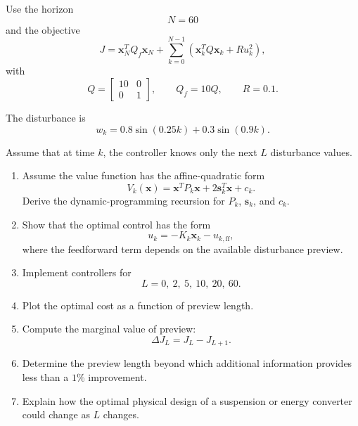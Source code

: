 Use the horizon
\begin{equation}
N=60
\end{equation}
and the objective
\begin{equation}
J=
\mathbf{x}_N^TQ_f\mathbf{x}_N
+
\sum_{k=0}^{N-1}
\left(
\mathbf{x}_k^TQ\mathbf{x}_k
+
Ru_k^2
\right),
\end{equation}
with
\begin{equation}
Q=
\begin{bmatrix}
10&0\\
0&1
\end{bmatrix},
\qquad
Q_f=10Q,
\qquad
R=0.1.
\end{equation}

The disturbance is
\begin{equation}
w_k=
0.8\sin(0.25k)
+
0.3\sin(0.9k).
\end{equation}

Assume that at time $k$, the controller knows only the next $L$
disturbance values.

\begin{enumerate}
    \item Assume the value function has the affine-quadratic form
    \begin{equation}
    V_k(\mathbf{x})
    =
    \mathbf{x}^TP_k\mathbf{x}
    +
    2\mathbf{s}_k^T\mathbf{x}
    +
    c_k.
    \end{equation}
    Derive the dynamic-programming recursion for $P_k$, $\mathbf{s}_k$,
    and $c_k$.

    \item Show that the optimal control has the form
    \begin{equation}
    u_k
    =
    -K_k\mathbf{x}_k
    -
    u_{k,\mathrm{ff}},
    \end{equation}
    where the feedforward term depends on the available disturbance preview.

    \item Implement controllers for
    \begin{equation}
    L=0,\ 2,\ 5,\ 10,\ 20,\ 60.
    \end{equation}

    \item Plot the optimal cost as a function of preview length.

    \item Compute the marginal value of preview:
    \begin{equation}
    \Delta J_L=J_L-J_{L+1}.
    \end{equation}

    \item Determine the preview length beyond which additional information
    provides less than a $1\%$ improvement.

    \item Explain how the optimal physical design of a suspension or energy
    converter could change as $L$ changes.
\end{enumerate}


